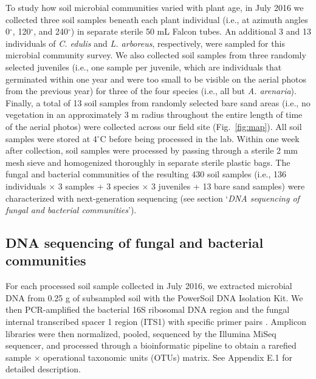 To study how soil microbial communities varied with plant age, in July 2016 we collected three soil samples beneath each plant individual (i.e., at azimuth angles 0$^{\circ}$, 120$^{\circ}$, and 240$^{\circ}$) in separate sterile 50 mL Falcon tubes. 
An additional 3 and 13 individuals of \textit{C. edulis} and \textit{L. arboreus}, respectively, were sampled for this microbial community survey. We also collected soil samples from three randomly selected juveniles (i.e., one sample per juvenile, which are individuals that germinated within one year and were too small to be visible on the aerial photos from the previous year) for three of the four species (i.e., all but \textit{A. arenaria}). Finally, a total of 13 soil samples from randomly selected bare sand areas (i.e., no vegetation in an approximately 3 m radius throughout the entire length of time of the aerial photos) were collected across our field site (Fig.~\ref{fig:map}). 
All soil samples were stored at 4$^{\circ}$C before being processed in the lab. Within one week after collection, soil samples were processed by passing through a sterile 2 mm mesh sieve and homogenized thoroughly in separate sterile plastic bags.
The fungal and bacterial communities of the resulting 430 soil samples (i.e., 136 individuals $\times$ 3 samples + 3 species $\times$ 3 juveniles + 13 bare sand samples) were characterized with next-generation sequencing (see section `\textit{DNA sequencing of fungal and bacterial communities}').
\par



\subsection*{DNA sequencing of fungal and bacterial communities}
For each processed soil sample collected in July 2016, we extracted microbial DNA from 0.25 g of subsampled soil with the PowerSoil DNA Isolation Kit. We then PCR-amplified the bacterial 16S ribosomal DNA region and the fungal internal transcribed spacer 1 region (ITS1) with specific primer pairs \citep{Caporaso2012, Toju2012, Lundberg2013, Hamady2008}. Amplicon libraries were then normalized, pooled, sequenced by the Illumina MiSeq sequencer, and processed through a bioinformatic pipeline \citep{Wang2007, Edgar2011, McMurdie2013, Tanabe2013, Zhang2014, Deshpande2016, Rognes2016, Davis2018} to obtain a rarefied sample $\times$ operational taxonomic units (OTUs) matrix. See Appendix E.1 for detailed description.
\par



